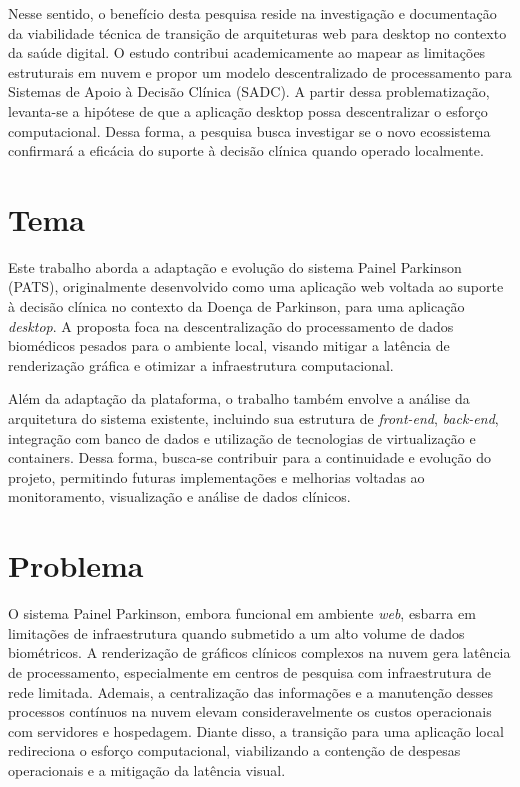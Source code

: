 Nesse sentido, o benefício desta pesquisa reside na investigação e documentação da viabilidade técnica de transição de arquiteturas web para desktop no contexto da saúde digital. O estudo contribui academicamente ao mapear as limitações estruturais em nuvem e propor um modelo descentralizado de processamento para Sistemas de Apoio à Decisão Clínica (SADC). A partir dessa problematização, levanta-se a hipótese de que a aplicação desktop possa descentralizar o esforço computacional. Dessa forma, a pesquisa busca investigar se o novo ecossistema confirmará a eficácia do suporte à decisão clínica quando operado localmente.

 

\section{Tema}
\label{sec:tema}

Este trabalho aborda a adaptação e evolução do sistema Painel Parkinson (PATS), originalmente desenvolvido como uma aplicação web voltada ao suporte à decisão clínica no contexto da Doença de Parkinson, para uma aplicação \textit{desktop}. A proposta foca na descentralização do processamento de dados biomédicos pesados para o ambiente local, visando mitigar a latência de renderização gráfica e otimizar a infraestrutura computacional.

Além da adaptação da plataforma, o trabalho também envolve a análise da arquitetura do sistema existente, incluindo sua estrutura de \textit{front-end}, \textit{back-end}, integração com banco de dados e utilização de tecnologias de virtualização e containers. Dessa forma, busca-se contribuir para a continuidade e evolução do projeto, permitindo futuras implementações e melhorias voltadas ao monitoramento, visualização e análise de dados clínicos.

\section{Problema}
\label{sec:Problema}

O sistema Painel Parkinson, embora funcional em ambiente \textit{web}, esbarra em limitações de infraestrutura quando submetido a um alto volume de dados biométricos. A renderização de gráficos clínicos complexos na nuvem gera latência de processamento, especialmente em centros de pesquisa com infraestrutura de rede limitada. Ademais, a centralização das informações e a manutenção desses processos contínuos na nuvem elevam consideravelmente os custos operacionais com servidores e hospedagem. Diante disso, a transição para uma aplicação local redireciona o esforço computacional, viabilizando a contenção de despesas operacionais e a mitigação da latência visual.

